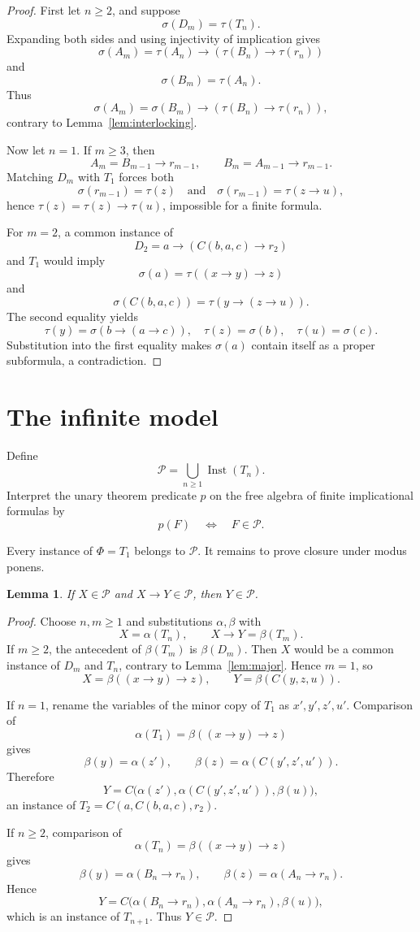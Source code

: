 \documentclass[11pt]{article}
\newtheorem{lemma}[theorem]{Lemma}
\newcommand{\Imp}{\mathbin{\to}}
\newcommand{\Inst}{\operatorname{Inst}}
\begin{document}
\begin{proof}
First let $n\ge2$, and suppose
\[
\sigma(D_m)=\tau(T_n).
\]
Expanding both sides and using injectivity of implication gives
\[
\sigma(A_m)=\tau(A_n)\Imp(\tau(B_n)\Imp\tau(r_n))
\]
and
\[
\sigma(B_m)=\tau(A_n).
\]
Thus
\[
\sigma(A_m)=\sigma(B_m)\Imp(\tau(B_n)\Imp\tau(r_n)),
\]
contrary to Lemma~\ref{lem:interlocking}.

Now let $n=1$.  If $m\ge3$, then
\[
A_m=B_{m-1}\Imp r_{m-1},\qquad
B_m=A_{m-1}\Imp r_{m-1}.
\]
Matching $D_m$ with $T_1$ forces both
\[
\sigma(r_{m-1})=\tau(z)
\quad\text{and}\quad
\sigma(r_{m-1})=\tau(z\Imp u),
\]
hence $\tau(z)=\tau(z)\Imp\tau(u)$, impossible for a finite formula.

For $m=2$, a common instance of
\[
D_2=a\Imp(C(b,a,c)\Imp r_2)
\]
and $T_1$ would imply
\[
\sigma(a)=\tau((x\Imp y)\Imp z)
\]
and
\[
\sigma(C(b,a,c))=\tau(y\Imp(z\Imp u)).
\]
The second equality yields
\[
\tau(y)=\sigma(b\Imp(a\Imp c)),\quad
\tau(z)=\sigma(b),\quad
\tau(u)=\sigma(c).
\]
Substitution into the first equality makes $\sigma(a)$ contain itself
as a proper subformula, a contradiction.
\end{proof}

\section{The infinite model}

Define
\[
\mathcal P=\bigcup_{n\ge1}\Inst(T_n).
\]
Interpret the unary theorem predicate $p$ on the free algebra of finite
implicational formulas by
\[
p(F)\quad\Longleftrightarrow\quad F\in\mathcal P.
\]

Every instance of $\Phi=T_1$ belongs to $\mathcal P$.  It remains to prove
closure under modus ponens.

\begin{lemma}\label{lem:mp}
If $X\in\mathcal P$ and $X\Imp Y\in\mathcal P$, then $Y\in\mathcal P$.
\end{lemma}

\begin{proof}
Choose $n,m\ge1$ and substitutions $\alpha,\beta$ with
\[
X=\alpha(T_n),\qquad X\Imp Y=\beta(T_m).
\]
If $m\ge2$, the antecedent of $\beta(T_m)$ is $\beta(D_m)$.
Then $X$ would be a common instance of $D_m$ and $T_n$, contrary to
Lemma~\ref{lem:major}.  Hence $m=1$, so
\[
X=\beta((x\Imp y)\Imp z),\qquad Y=\beta(C(y,z,u)).
\]

If $n=1$, rename the variables of the minor copy of $T_1$ as
$x',y',z',u'$.  Comparison of
\[
\alpha(T_1)=\beta((x\Imp y)\Imp z)
\]
gives
\[
\beta(y)=\alpha(z'),\qquad
\beta(z)=\alpha(C(y',z',u')).
\]
Therefore
\[
Y=C\bigl(\alpha(z'),\alpha(C(y',z',u')),\beta(u)\bigr),
\]
an instance of $T_2=C(a,C(b,a,c),r_2)$.

If $n\ge2$, comparison of
\[
\alpha(T_n)=\beta((x\Imp y)\Imp z)
\]
gives
\[
\beta(y)=\alpha(B_n\Imp r_n),\qquad
\beta(z)=\alpha(A_n\Imp r_n).
\]
Hence
\[
Y=C\bigl(\alpha(B_n\Imp r_n),
         \alpha(A_n\Imp r_n),\beta(u)\bigr),
\]
which is an instance of $T_{n+1}$.  Thus $Y\in\mathcal P$.
\end{proof}
\end{document}
